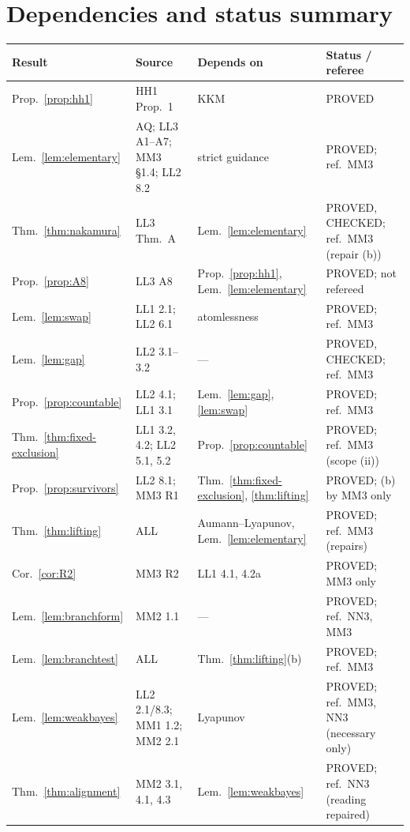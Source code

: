 \documentclass[11pt]{article}
\theoremstyle{definition}
\theoremstyle{remark}
\begin{document}
\section{Dependencies and status summary}\label{sec:deps}

{\small
\begin{longtable}{>{\raggedright}p{}>{\raggedright}p{}>{\raggedright}p{}>{\raggedright\arraybackslash}p{}}
\toprule
Result & Source & Depends on & Status / referee \\
\midrule
\endhead
Prop.~\ref{prop:hh1} & HH1 Prop.~1 & KKM & PROVED \\
Lem.~\ref{lem:elementary} & AQ; LL3 A1--A7; MM3 \S1.4; LL2 8.2 & strict guidance & PROVED; ref.\ MM3 \\
Thm.~\ref{thm:nakamura} & LL3 Thm.~A & Lem.~\ref{lem:elementary} & PROVED, CHECKED; ref.\ MM3 (repair (b)) \\
Prop.~\ref{prop:A8} & LL3 A8 & Prop.~\ref{prop:hh1}, Lem.~\ref{lem:elementary} & PROVED; not refereed \\
Lem.~\ref{lem:swap} & LL1 2.1; LL2 6.1 & atomlessness & PROVED; ref.\ MM3 \\
Lem.~\ref{lem:gap} & LL2 3.1--3.2 & --- & PROVED, CHECKED; ref.\ MM3 \\
Prop.~\ref{prop:countable} & LL2 4.1; LL1 3.1 & Lem.~\ref{lem:gap}, \ref{lem:swap} & PROVED; ref.\ MM3 \\
Thm.~\ref{thm:fixed-exclusion} & LL1 3.2, 4.2; LL2 5.1, 5.2 & Prop.~\ref{prop:countable} & PROVED; ref.\ MM3 (scope (ii)) \\
Prop.~\ref{prop:survivors} & LL2 8.1; MM3 R1 & Thm.~\ref{thm:fixed-exclusion}, \ref{thm:lifting} & PROVED; (b) by MM3 only \\
Thm.~\ref{thm:lifting} & ALL & Aumann--Lyapunov, Lem.~\ref{lem:elementary} & PROVED; ref.\ MM3 (repairs) \\
Cor.~\ref{cor:R2} & MM3 R2 & LL1 4.1, 4.2a & PROVED; MM3 only \\
Lem.~\ref{lem:branchform} & MM2 1.1 & --- & PROVED; ref.\ NN3, MM3 \\
Lem.~\ref{lem:branchtest} & ALL & Thm.~\ref{thm:lifting}(b) & PROVED; ref.\ MM3 \\
Lem.~\ref{lem:weakbayes} & LL2 2.1/8.3; MM1 1.2; MM2 2.1 & Lyapunov & PROVED; ref.\ MM3, NN3 (necessary only) \\
Thm.~\ref{thm:alignment} & MM2 3.1, 4.1, 4.3 & Lem.~\ref{lem:weakbayes} & PROVED; ref.\ NN3 (reading repaired) \\

\end{longtable}}
\end{document}
